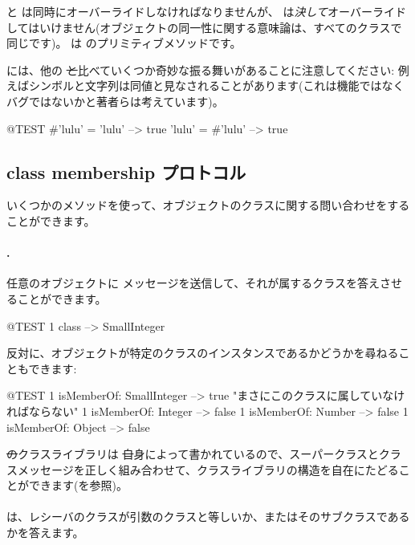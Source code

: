 \documentclass[a4paper,10pt,twoside]{book}
\begin{document}
\ct{=} と  は同時にオーバーライドしなければなりませんが、\ct{==} は\emph{決して}オーバーライドしてはいけません(オブジェクトの同一性に関する意味論は、すべてのクラスで同じです)。\ct{==} は  のプリミティブメソッドです。%

\pharo には、他の \st と比べていくつか奇妙な振る舞いがあることに注意してください: 例えばシンボルと文字列は同値と見なされることがあります(これは機能ではなくバグではないかと著者らは考えています)。

\begin{code}{@TEST}
#'lulu' = 'lulu' --> true
'lulu' = #'lulu' --> true
\end{code}


\subsection{class membership プロトコル}
いくつかのメソッドを使って、オブジェクトのクラスに関する問い合わせをすることができます。%

\paragraph{.} 任意のオブジェクトに  メッセージを送信して、それが属するクラスを答えさせることができます。
\begin{code}{@TEST}
1 class --> SmallInteger
\end{code}

反対に、オブジェクトが特定のクラスのインスタンスであるかどうかを尋ねることもできます:
\begin{code}{@TEST}
1 isMemberOf: SmallInteger --> true    "まさにこのクラスに属していなければならない"
1 isMemberOf: Integer          --> false
1 isMemberOf: Number        --> false
1 isMemberOf: Object           --> false
\end{code}

\st のクラスライブラリは \st 自身によって書かれているので、スーパークラスとクラスメッセージを正しく組み合わせて、クラスライブラリの構造を自在にたどることができます(を参照)。

\paragraph{}
 は、レシーバのクラスが引数のクラスと等しいか、またはそのサブクラスであるかを答えます。
\end{document}
